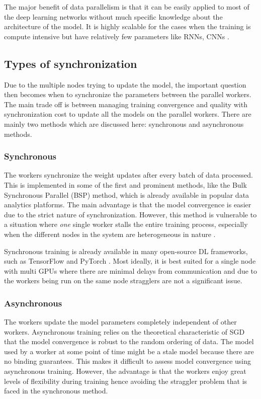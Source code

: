 The major benefit of data parallelism is that it can be easily applied to most of the deep learning networks without much specific knowledge about the architecture of the model. It is highly scalable for the cases when the training is compute intensive but have relatively few parameters like RNNs, CNNs \cite{Krizhevsky2014OneNetworks}.


\subsection{Types of synchronization}
Due to the multiple nodes trying to update the model, the important question then becomes when to synchronize the parameters between the parallel workers. The main trade off is between managing training convergence and quality with synchronization cost to update all the models on the parallel workers. There are mainly two methods which are discussed here: synchronous and asynchronous methods.

\subsubsection{Synchronous}
The workers synchronize the weight updates after every batch of data processed. This is implemented in some of the first and prominent methods, like the Bulk Synchronous Parallel (BSP) \cite{Valiant1990AComputation} method, which is already available in popular data analytics platforms. The main advantage is that the model convergence is easier due to the strict nature of synchronization. However, this method is vulnerable to a situation where \emph{one} single worker stalls the entire training process, especially when the different nodes in the system are heterogeneous in nature \cite{CiparSolvingStaleness}.

Synchronous training is already available in many open-source DL frameworks, such
as TensorFlow \cite{AbadiTensorFlow:Systems} and PyTorch \cite{Paszke2019PyTorch:Library}. Most ideally, it is best suited for a single node with multi GPUs where there are minimal delays from communication and due to the workers being run on the same node stragglers are not a significant issue.

\subsubsection{Asynchronous}
The workers update the model parameters completely independent of other workers. Asynchronous training relies on the theoretical characteristic of SGD that the model convergence is robust to the random ordering of data. The model used by a worker at some point of time might be a stale model because there are no binding guarantees. This makes it difficult to assess model convergence using asynchronous training. However, the advantage is that the workers enjoy great levels of flexibility during training hence avoiding the straggler problem that is faced in the synchronous method.

